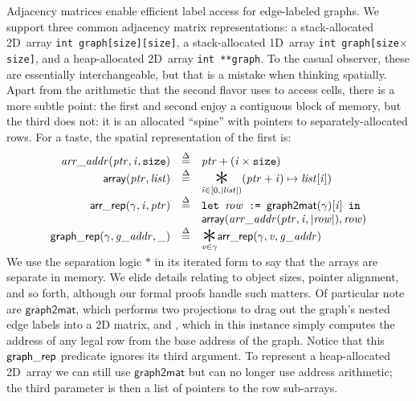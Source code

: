 Adjacency matrices enable efficient label access for edge-labeled graphs.
We support three common
adjacency matrix representations:
a stack-allocated 2D~array \texttt{int~graph[size][size]},
a stack-allocated 1D~array \texttt{int~graph[size$\times$size]},
and a heap-allocated 2D~array \texttt{int~**graph}.
To the casual observer, these are essentially interchangeable, but
that is a mistake when thinking spatially. Apart from the
arithmetic that the second flavor uses to access cells, there is a
more subtle point: the first and second enjoy a contiguous block of
memory, but the third does not: it is an allocated ``spine'' with pointers to separately-allocated rows.
For a taste, the spatial representation of the first is:
\vspace{-0.5em}
\begin{equation*}
\begin{array}{r@{\quad}c@{\quad}l}
\m{arr\_addr} (\m{ptr}, \m{i},\texttt{size}) & \defeq &
  \m{ptr} + (\m{i} \times \hide{\texttt{sizeof}(\texttt{int}) \times} \texttt{size}) \\
\mathsf{array}(\m{ptr},\m{list}) & \defeq& \underset{\m{i} \in [0, \lvert\m{list}\rvert)}{\bigstar} (\m{ptr} + \m{i}) \mapsto \m{list}[\m{i}]) \\
\p{arr\_rep}(\gamma, \m{i}, \m{ptr}) & \defeq & \texttt{let }\m{row} \texttt{ := }\mathsf{graph2mat}(\gamma)[\m{i}] \texttt{ in } \\
&&\mathsf{array}(\m{arr\_addr}(\m{ptr},\m{i},\lvert\m{row}\rvert), \m{row}) \\
\p{graph\_rep}(\gamma, \m{g\_addr}, \_) & \defeq & \underset{\m{v} \in \gamma}{\bigstar} \p{arr\_rep}(\gamma, \m{v}, \m{g\_addr}) \\
[-0.5em]
\end{array}
\end{equation*}
We use the separation logic $\ast$ in its iterated form
to say that the arrays are separate in memory.  We elide details relating to object sizes, pointer alignment, and so forth, although our formal proofs handle such matters.
Of particular note are $\mathsf{graph2mat}$, which performs two projections to
drag out the graph's nested edge labels into a 2D matrix, and
, which in this instance simply computes
the address of any legal row  from the base address of the graph.
Notice that this $\mathsf{graph\_rep}$ predicate ignores its third argument.
To represent a heap-allocated 2D~array we can still use $\mathsf{graph2mat}$
but can no longer use address arithmetic; the third
parameter is then a list of pointers to the row sub-arrays.

